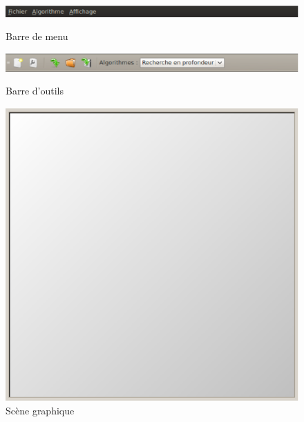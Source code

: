 \documentclass[11pt,a4paper]{article}
\begin{document}
		\newpage
			\begin{figure}[h!]
				\begin{minipage}[b]{1\linewidth}
					\centering
					\includegraphics[scale=0.64]{menuBar.eps}
					\caption{Barre de menu}
					\label{img_barre_menu}
					\vspace{.5cm}
				\end{minipage}
				\begin{minipage}[b]{1\linewidth}
					\centering
					\includegraphics[scale=0.64]{toolBar.eps}
					\caption{Barre d'outils}
					\label{img_barre_outil}
					\vspace{.5cm}
				\end{minipage}
				\begin{minipage}[b]{0.5\linewidth}
					\centering 
					\includegraphics[scale=0.6]{graphicView.eps}
					\caption{Scène graphique}
					\label{img_scene_graphique}
				\end{minipage}\hfill
				\begin{minipage}[b]{0.5\linewidth}   
					\centering 

\end{minipage}
\end{figure}
\end{document}
